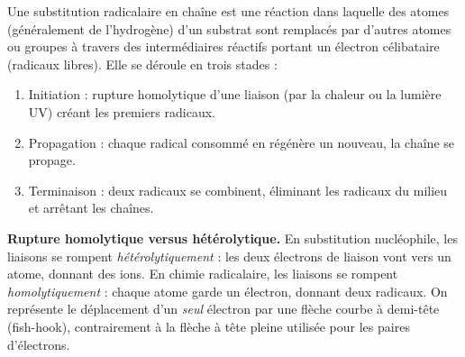 \documentclass[11pt]{article}
\newcommand{\cle}[1]{{\popxbold\color{popdark}#1}}
\begin{document}
\begin{definition}
Une \cle{substitution radicalaire en chaîne} est une réaction dans laquelle des atomes (généralement de l'hydrogène) d'un substrat sont remplacés par d'autres atomes ou groupes à travers des intermédiaires réactifs portant un électron célibataire (radicaux libres). Elle se déroule en trois stades :
\begin{enumerate}
\item \cle{Initiation} : rupture homolytique d'une liaison (par la chaleur ou la lumière UV) créant les premiers radicaux.
\item \cle{Propagation} : chaque radical consommé en régénère un nouveau, la chaîne se propage.
\item \cle{Terminaison} : deux radicaux se combinent, éliminant les radicaux du milieu et arrêtant les chaînes.
\end{enumerate}
\end{definition}

\textbf{Rupture homolytique versus hétérolytique.} En substitution nucléophile, les liaisons se rompent \emph{hétérolytiquement} : les deux électrons de liaison vont vers un atome, donnant des ions. En chimie radicalaire, les liaisons se rompent \emph{homolytiquement} : chaque atome garde un électron, donnant deux radicaux. On représente le déplacement d'un \emph{seul} électron par une \cle{flèche courbe à demi-tête (fish-hook)}, contrairement à la flèche à tête pleine utilisée pour les paires d'électrons.
\end{document}
